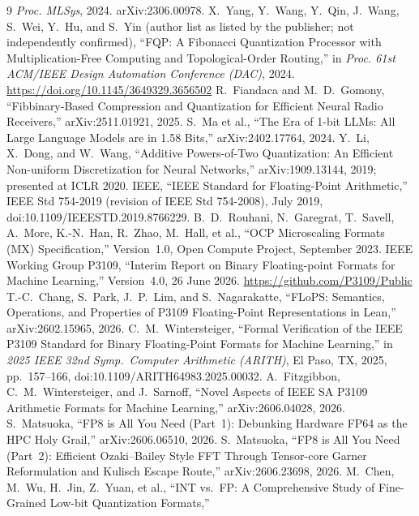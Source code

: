 \documentclass[11pt]{article}
\theoremstyle{definition}
\begin{document}
\begin{thebibliography}{9}
\emph{Proc. MLSys}, 2024. arXiv:2306.00978.
 X.~Yang, Y.~Wang, Y.~Qin, J.~Wang, S.~Wei, Y.~Hu, and S.~Yin
(author list as listed by the publisher; not independently confirmed),
``FQP: A Fibonacci Quantization Processor with Multiplication-Free Computing and
Topological-Order Routing,'' in \emph{Proc. 61st ACM/IEEE Design Automation
Conference (DAC)}, 2024. \url{https://doi.org/10.1145/3649329.3656502}
 R.~Fiandaca and M.~D.~Gomony, ``Fibbinary-Based Compression
and Quantization for Efficient Neural Radio Receivers,'' arXiv:2511.01921, 2025.
 S.~Ma et al., ``The Era of 1-bit LLMs: All Large Language Models are in 1.58 Bits,'' arXiv:2402.17764, 2024.
 Y.~Li, X.~Dong, and W.~Wang, ``Additive Powers-of-Two
Quantization: An Efficient Non-uniform Discretization for Neural Networks,''
arXiv:1909.13144, 2019; presented at ICLR 2020.
 IEEE, ``IEEE Standard for Floating-Point Arithmetic,''
IEEE Std 754-2019 (revision of IEEE Std 754-2008), July 2019,
doi:10.1109/IEEESTD.2019.8766229.
 B.~D.~Rouhani, N.~Garegrat, T.~Savell, A.~More, K.-N.~Han,
R.~Zhao, M.~Hall, et al., ``OCP Microscaling Formats (MX) Specification,''
Version~1.0, Open Compute Project, September 2023.
 IEEE Working Group P3109, ``Interim Report on Binary
Floating-point Formats for Machine Learning,'' Version~4.0, 26 June 2026.
\url{https://github.com/P3109/Public}
 T.-C.~Chang, S.~Park, J.~P.~Lim, and S.~Nagarakatte,
``FLoPS: Semantics, Operations, and Properties of P3109 Floating-Point
Representations in Lean,'' arXiv:2602.15965, 2026.
 C.~M.~Wintersteiger, ``Formal Verification of the
IEEE P3109 Standard for Binary Floating-Point Formats for Machine Learning,'' in
\emph{2025 IEEE 32nd Symp.\ Computer Arithmetic (ARITH)}, El Paso, TX, 2025,
pp.~157--166, doi:10.1109/ARITH64983.2025.00032.
 A.~Fitzgibbon, C.~M.~Wintersteiger, and
J.~Sarnoff, ``Novel Aspects of IEEE SA P3109 Arithmetic Formats for Machine
Learning,'' arXiv:2606.04028, 2026.
 S.~Matsuoka, ``FP8 is All You Need (Part~1):
Debunking Hardware FP64 as the HPC Holy Grail,'' arXiv:2606.06510, 2026.
 S.~Matsuoka, ``FP8 is All You Need (Part~2):
Efficient Ozaki--Bailey Style FFT Through Tensor-core Garner Reformulation and
Kulisch Escape Route,'' arXiv:2606.23698, 2026.
 M.~Chen, M.~Wu, H.~Jin, Z.~Yuan, et al., ``INT vs.\ FP:
A Comprehensive Study of Fine-Grained Low-bit Quantization Formats,''

\end{thebibliography}
\end{document}
